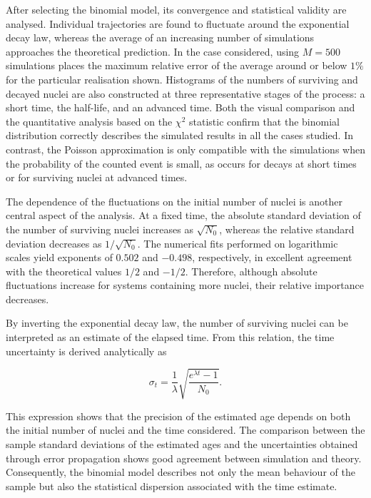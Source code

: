 \documentclass[12pt,a4paper]{article}
\begin{document}
After selecting the binomial model, its convergence and statistical validity are analysed. Individual trajectories are found to fluctuate around the exponential decay law, whereas the average of an increasing number of simulations approaches the theoretical prediction. In the case considered, using $M=500$ simulations places the maximum relative error of the average around or below $1\%$ for the particular realisation shown. Histograms of the numbers of surviving and decayed nuclei are also constructed at three representative stages of the process: a short time, the half-life, and an advanced time. Both the visual comparison and the quantitative analysis based on the $\chi^2$ statistic confirm that the binomial distribution correctly describes the simulated results in all the cases studied. In contrast, the Poisson approximation is only compatible with the simulations when the probability of the counted event is small, as occurs for decays at short times or for surviving nuclei at advanced times.

The dependence of the fluctuations on the initial number of nuclei is another central aspect of the analysis. At a fixed time, the absolute standard deviation of the number of surviving nuclei increases as $\sqrt{N_0}$, whereas the relative standard deviation decreases as $1/\sqrt{N_0}$. The numerical fits performed on logarithmic scales yield exponents of $0.502$ and $-0.498$, respectively, in excellent agreement with the theoretical values $1/2$ and $-1/2$. Therefore, although absolute fluctuations increase for systems containing more nuclei, their relative importance decreases.

By inverting the exponential decay law, the number of surviving nuclei can be interpreted as an estimate of the elapsed time. From this relation, the time uncertainty is derived analytically as

\begin{equation*}
\sigma_t=
\frac{1}{\lambda}
\sqrt{
\frac{e^{\lambda t}-1}{N_0}
}.
\end{equation*}

This expression shows that the precision of the estimated age depends on both the initial number of nuclei and the time considered. The comparison between the sample standard deviations of the estimated ages and the uncertainties obtained through error propagation shows good agreement between simulation and theory. Consequently, the binomial model describes not only the mean behaviour of the sample but also the statistical dispersion associated with the time estimate.
\end{document}
